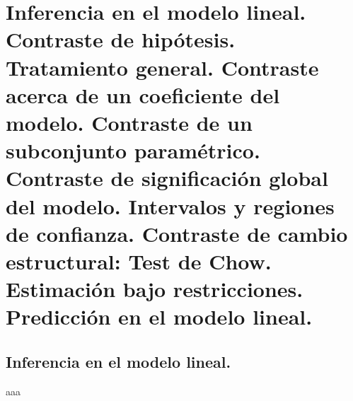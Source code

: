 
\chapter{Inferencia en el modelo lineal. Contraste de hip\'otesis. Tratamiento
general. Contraste acerca de un coeficiente del modelo. Contraste
de un subconjunto param\'etrico. Contraste de significaci\'on global del
modelo. Intervalos y regiones de confianza. Contraste de cambio estructural:
Test de Chow. Estimaci\'on bajo restricciones. Predicci\'on en el modelo
lineal.}


\section{Inferencia en el modelo lineal.}

aaa
